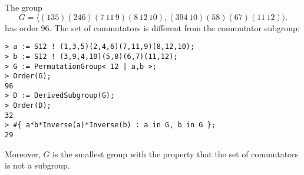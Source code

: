 \begin{example}
The group 
\[
G=\langle (135)(246)(7\,11\,9)(8\,12\,10),(394\,10)(58)(67)(11\,12)\rangle.
\]
has order 96. The set of commutators 
is different from the commutator subgroup:
\begin{lstlisting}
> a := S12 ! (1,3,5)(2,4,6)(7,11,9)(8,12,10);
> b := S12 ! (3,9,4,10)(5,8)(6,7)(11,12);
> G := PermutationGroup< 12 | a,b >;
> Order(G);
96
> D := DerivedSubgroup(G);
> Order(D);
32
> #{ a*b*Inverse(a)*Inverse(b) : a in G, b in G };
29
\end{lstlisting}
Moreover, 
$G$ is the smallest group with the property that  
the set of commutators is not a subgroup. 
\end{example}
